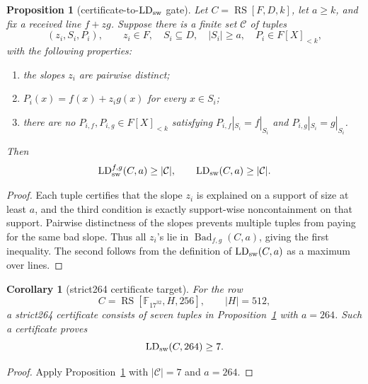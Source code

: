 \documentclass[11pt]{article}
\newtheorem{proposition}{Proposition}
\newtheorem{corollary}{Corollary}
\newcommand{\F}{\mathbb F}
\newcommand{\RS}{\operatorname{RS}}
\begin{document}
\begin{proposition}[certificate-to-\(\operatorname{LD}_{\rm sw}\) gate]
\label{prop:certificate-to-ldsw}
Let \(C=\RS[F,D,k]\), let \(a\ge k\), and fix a received line \(f+zg\).  Suppose
there is a finite set \(\mathcal C\) of tuples
\[
  (z_i,S_i,P_i),
  \qquad z_i\in F,
  \quad S_i\subseteq D,
  \quad |S_i|\ge a,
  \quad P_i\in F[X]_{<k},
\]
with the following properties:
\begin{enumerate}
\item the slopes \(z_i\) are pairwise distinct;
\item \(P_i(x)=f(x)+z_i g(x)\) for every \(x\in S_i\);
\item there are no \(P_{i,f},P_{i,g}\in F[X]_{<k}\) satisfying
  \(P_{i,f}|_{S_i}=f|_{S_i}\) and \(P_{i,g}|_{S_i}=g|_{S_i}\).
\end{enumerate}
Then
\[
  \operatorname{LD}_{\rm sw}^{f,g}(C,a)\ge |\mathcal C|,
  \qquad
  \operatorname{LD}_{\rm sw}(C,a)\ge |\mathcal C|.
\]
\end{proposition}

\begin{proof}
Each tuple certifies that the slope \(z_i\) is explained on a support of size at
least \(a\), and the third condition is exactly support-wise noncontainment on
that support.  Pairwise distinctness of the slopes prevents multiple tuples from
paying for the same bad slope.  Thus all \(z_i\)'s lie in
\(\operatorname{Bad}_{f,g}(C,a)\), giving the first inequality.  The second
follows from the definition of \(\operatorname{LD}_{\rm sw}(C,a)\) as a maximum
over lines.
\end{proof}

\begin{corollary}[strict264 certificate target]
\label{cor:strict264-certificate-target}
For the row
\[
  C=\RS[\F_{17^{32}},H,256],
  \qquad |H|=512,
\]
a strict264 certificate consists of seven tuples in
Proposition~\ref{prop:certificate-to-ldsw} with \(a=264\).  Such a certificate
proves
\[
  \operatorname{LD}_{\rm sw}(C,264)\ge 7.
\]
\end{corollary}

\begin{proof}
Apply Proposition~\ref{prop:certificate-to-ldsw} with
\(|\mathcal C|=7\) and \(a=264\).
\end{proof}
\end{document}
